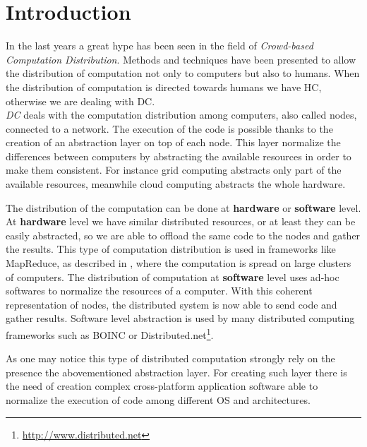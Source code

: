 \cleardoublepage
\chapter{Introduction}
\label{intro}

In the last years a great hype has been seen in the field of \emph{Crowd-based
Computation Distribution}. Methods and techniques have been presented to allow the
distribution of computation not only to computers but also to humans. When the
distribution of computation is directed towards humans we have \ac{HC},
otherwise we are dealing with \ac{DC}.\\


\emph{\acl{DC}} deals with the computation distribution among computers, also
called nodes, connected to a network. The execution of the code is possible thanks
to the creation of an abstraction layer on top of each node. This layer normalize
the differences between computers by abstracting the available resources in order
to make them consistent. For instance grid computing abstracts only part of the
available resources, meanwhile cloud computing abstracts the whole hardware.

The distribution of the computation can be done at \textbf{hardware} or
\textbf{software} level.
At \textbf{hardware} level we have similar distributed resources, or at least
they can be easily abstracted, so we are able to offload the same code to the
nodes and gather the results. This type of computation distribution is used in
frameworks like MapReduce, as described in \cite{dean2008mapreduce}, where the
computation is spread on large clusters of computers.
The distribution of computation at \textbf{software} level uses ad-hoc softwares
to normalize the resources of a computer. With this coherent representation of
nodes, the distributed system is now able to send code and gather results.
Software level abstraction is used by many distributed computing frameworks such
as \ac{BOINC} or Distributed.net\footnote{\url{http://www.distributed.net}}.

As one may notice this type of distributed computation strongly rely on the
presence the abovementioned abstraction layer. For creating such layer there is
the need of creation complex cross-platform application software able to normalize
the execution of code among different OS and architectures.\\



